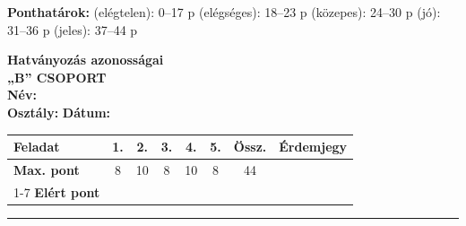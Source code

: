 \documentclass[a4paper,11pt]{article}
\begin{document}
\vfill
\noindent
\begin{center}
\small
\textbf{Ponthatárok:}  (elégtelen): 0--17 p  (elégséges): 18--23 p  (közepes): 24--30 p  (jó): 31--36 p  (jeles): 37--44 p
\end{center}

\newpage


\noindent
\begin{minipage}[t]{0.45\textwidth}
  \vspace{0pt}
  
  {\Large\textbf{Hatványozás azonosságai}}\\[2mm]
  {\large\textbf{„B” CSOPORT}}\\[2mm]
  \textbf{Név:} \underline{\hspace{4.5cm}}\\[2mm]
  \textbf{Osztály:} \underline{\hspace{1.5cm}} \quad \textbf{Dátum:} \underline{\hspace{2cm}}
\end{minipage}
\hfill
\begin{minipage}[t]{0.53\textwidth}
  \vspace{0pt}
  \begin{flushright}
  {\small
  \begin{tabular}{|l|c|c|c|c|c||c||c|}
    \hline
    \textbf{Feladat} & 1. & 2. & 3. & 4. & 5. & \textbf{Össz.} & \textbf{Érdemjegy} \\ \hline
    \textbf{Max. pont} & 8 & 10 & 8 & 10 & 8 & 44 & \\ \cline{1-7}
    \textbf{Elért pont} &  &  &  &  &  &  & \\ \hline
  \end{tabular}
  }
  \end{flushright}
\end{minipage}
\vspace{2mm}
\hrule
\vspace{4mm}
\end{document}
